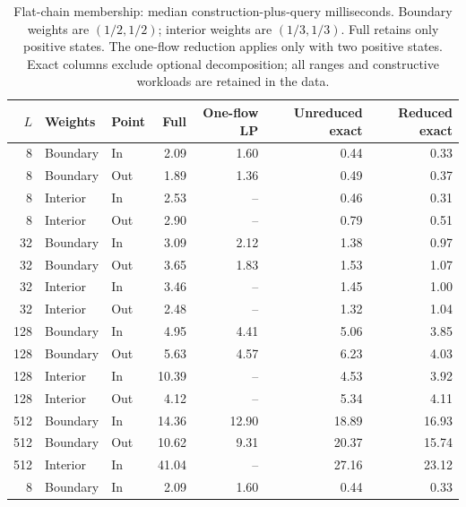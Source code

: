 \begin{table}[tb]\centering\small
\caption{Flat-chain membership: median construction-plus-query milliseconds. Boundary weights are $(1/2,1/2)$; interior weights are $(1/3,1/3)$. Full retains only positive states. The one-flow reduction applies only with two positive states. Exact columns exclude optional decomposition; all ranges and constructive workloads are retained in the data.}
\label{tab:computation-flat}
\begin{tabular}{rllrrrr}\toprule
$L$ & Weights & Point & Full & One-flow LP & Unreduced exact & Reduced exact\\\midrule
8 & Boundary & In & 2.09 & 1.60 & 0.44 & 0.33 \\
8 & Boundary & Out & 1.89 & 1.36 & 0.49 & 0.37 \\
8 & Interior & In & 2.53 & -- & 0.46 & 0.31 \\
8 & Interior & Out & 2.90 & -- & 0.79 & 0.51 \\
32 & Boundary & In & 3.09 & 2.12 & 1.38 & 0.97 \\
32 & Boundary & Out & 3.65 & 1.83 & 1.53 & 1.07 \\
32 & Interior & In & 3.46 & -- & 1.45 & 1.00 \\
32 & Interior & Out & 2.48 & -- & 1.32 & 1.04 \\
128 & Boundary & In & 4.95 & 4.41 & 5.06 & 3.85 \\
128 & Boundary & Out & 5.63 & 4.57 & 6.23 & 4.03 \\
128 & Interior & In & 10.39 & -- & 4.53 & 3.92 \\
128 & Interior & Out & 4.12 & -- & 5.34 & 4.11 \\
512 & Boundary & In & 14.36 & 12.90 & 18.89 & 16.93 \\
512 & Boundary & Out & 10.62 & 9.31 & 20.37 & 15.74 \\
512 & Interior & In & 41.04 & -- & 27.16 & 23.12 \\
8 & Boundary & In & 2.09 & 1.60 & 0.44 & 0.33 \\
\bottomrule\end{tabular}\end{table}
